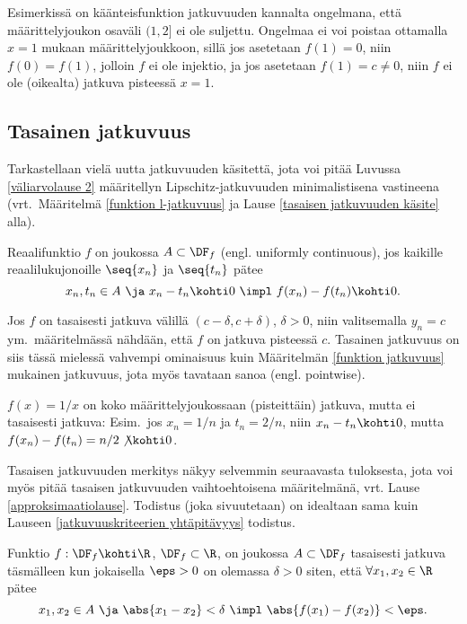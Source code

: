 Esimerkissä on käänteisfunktion jatkuvuuden kannalta ongelmana, että määrittelyjoukon osaväli 
$(1,2]$ ei ole suljettu. Ongelmaa ei voi poistaa ottamalla $x=1$ mukaan määrittelyjoukkoon,
sillä jos asetetaan $f(1)=0$, niin $f(0)=f(1)$, jolloin $f$ ei ole injektio, ja jos asetetaan 
$f(1)=c \neq 0$, niin $f$ ei ole (oikealta) jatkuva pisteessä $x=1$.

\subsection{Tasainen jatkuvuus}
 

Tarkastellaan vielä uutta jatkuvuuden käsitettä, jota voi pitää Luvussa 
\ref{väliarvolause 2} määritellyn Lipschitz-jatkuvuuden minimalistisena vastineena 
(vrt.\ Määritelmä \ref{funktion l-jatkuvuus} ja Lause \ref{tasaisen jatkuvuuden käsite} alla).
\begin{Def} Reaalifunktio $f$ on joukossa $A\subset\DF_f$  
(engl. uniformly continuous), jos kaikille reaalilukujonoille $\seq{x_n}$ ja $\seq{t_n}$ pätee
\[
x_n,t_n\in A \ \ja \ x_n-t_n\kohti 0 \ \impl \ f(x_n)-f(t_n)\kohti 0.
\]
\end{Def}
Jos $f$ on tasaisesti jatkuva välillä $(c-\delta,c+\delta)$, $\delta>0$, niin valitsemalla 
$y_n=c$ ym.\ määritelmässä nähdään, että $f$ on jatkuva pisteessä $c$. Tasainen jatkuvuus 
on siis tässä mielessä vahvempi ominaisuus kuin Määritelmän \ref{funktion jatkuvuus} mukainen
%
jatkuvuus, jota myös tavataan sanoa  (engl. pointwise).
\begin{Exa}
$f(x)=1/x$ on koko määrittelyjoukossaan (pisteittäin) jatkuva, mutta ei tasaisesti jatkuva: 
Esim.\ jos $x_n=1/n$ ja $t_n=2/n$, niin $x_n-t_n \kohti 0$, mutta 
$f(x_n)-f(t_n) = n/2 \not\kohti 0$.
\end{Exa}
Tasaisen jatkuvuuden merkitys näkyy selvemmin seuraavasta tuloksesta, jota voi myös pitää 
tasaisen jatkuvuuden vaihtoehtoisena määritelmänä, vrt. Lause \ref{approksimaatiolause}.
Todistus (joka sivuutetaan) on idealtaan sama kuin Lauseen
\ref{jatkuvuuskriteerien yhtäpitävyys} todistus.
\begin{*Lause} \label{tasaisen jatkuvuuden käsite}
Funktio $f:\DF_f\kohti\R$, $\DF_f\subset\R$, on joukossa $A\subset\DF_f$ tasaisesti jatkuva 
täsmälleen kun jokaisella $\eps>0$ on olemassa $\delta>0$ siten, että $\forall x_1,x_2\in\R$
pätee
\[
x_1,x_2\in A \ \ja \ \abs{x_1-x_2}<\delta \ \impl \ \abs{f(x_1)-f(x_2)}<\eps.
\]
\end{*Lause}
